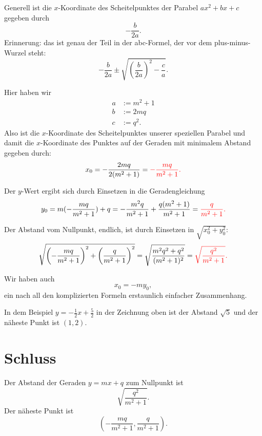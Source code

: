 \documentclass[a4paper]{amsart}
\theoremstyle{definition}
\begin{document}
Generell ist die $x$-Koordinate des Scheitelpunktes der Parabel $a x^2 + b x + c$ gegeben durch
\begin{equation}
   -\frac{b}{2a}.
\end{equation}
Erinnerung: das ist genau der Teil in der abc-Formel, der vor dem plus-minus-Wurzel steht:
\begin{equation}
   -\frac{b}{2a} \pm \sqrt{\left ( \frac{b}{2a} \right )^2 - \frac{c}{a} }.
\end{equation}
 
Hier haben wir
\begin{align}
   a &:= m^2 + 1\\
   b &:= 2mq\\
   c &:= q^2.
\end{align}
Also  ist die $x$-Koordinate des Scheitelpunktes unserer speziellen Parabel und damit die $x$-Koordinate des Punktes auf der Geraden mit minimalem Abstand gegeben durch:
\begin{equation}
   x_0 = -\frac{2mq}{2(m^2+1)} = \color{red}-\frac{mq}{m^2+1}.
\end{equation}

Der $y$-Wert ergibt sich durch Einsetzen in die Geradengleichung
\begin{equation}
   y_0 = m(-\frac{mq}{m^2+1}) + q = -\frac{m^2q}{m^2 + 1} + \frac{q(m^2 + 1)}{m^2 + 1}
   = \color{red} \frac{q}{m^2+1}.
\end{equation} 

Der Abstand vom Nullpunkt, endlich, ist durch Einsetzen in $\sqrt{x_0^2 + y_0^2}$:
\begin{equation}
   \sqrt{\left(-\frac{mq}{m^2+1} \right)^2 + \left(\frac{q}{m^2+1} \right)^2} =
   \sqrt{\frac{m^2q^2 + q^2}{(m^2+1)^2}} = 
   \color{red} \sqrt{\frac{q^2}{m^2+1}}.
\end{equation}

Wir haben auch
\begin{equation}
   x_0 = -my_0,
\end{equation}
ein nach all den komplizierten Formeln erstaunlich einfacher Zusammenhang.

In dem Beispiel $y = -\frac{1}{2}x + \frac{5}{2}$ in der Zeichnung oben ist der Abstand $\sqrt{5}$ und der näheste Punkt ist $(1,2)$.

\section{Schluss}
Der Abstand der Geraden $y=mx+q$ zum Nullpunkt ist 
\begin{equation}
	\sqrt{\frac{q^2}{m^2+1}}.
\end{equation}
Der näheste Punkt ist
\begin{equation}
	\left( -\frac{mq}{m^2+1}, \frac{q}{m^2+1} \right).
\end{equation}
\end{document}
